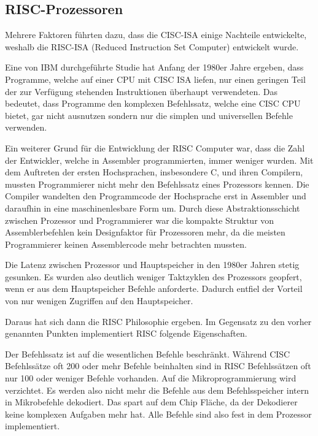 \documentclass[12pt]{article}
\begin{document}
\subsection{RISC-Prozessoren}
Mehrere Faktoren führten dazu, dass die CISC-ISA einige Nachteile entwickelte, weshalb die RISC-ISA (Reduced Instruction Set Computer) entwickelt wurde.


Eine von IBM durchgeführte Studie hat Anfang der 1980er Jahre ergeben, dass Programme, welche auf einer CPU mit CISC ISA liefen, nur einen geringen Teil der zur Verfügung stehenden Instruktionen überhaupt verwendeten. Das bedeutet, dass Programme den komplexen Befehlssatz, welche eine CISC CPU bietet, gar nicht ausnutzen sondern nur die simplen und universellen Befehle verwenden. 

Ein weiterer Grund für die Entwicklung der RISC Computer war, dass die Zahl der Entwickler, welche in Assembler programmierten, immer weniger wurden. Mit dem Auftreten der ersten Hochsprachen, insbesondere C, und ihren Compilern, mussten Programmierer nicht mehr den Befehlssatz eines Prozessors kennen. Die Compiler wandelten den Programmcode der Hochsprache erst in Assembler und daraufhin in eine maschinenlesbare Form um. Durch diese Abstraktionsschicht zwischen Prozessor und Programmierer war die kompakte Struktur von Assemblerbefehlen kein Designfaktor für Prozessoren mehr, da die meisten Programmierer keinen Assemblercode mehr betrachten mussten.

Die Latenz zwischen Prozessor und Hauptspeicher in den 1980er Jahren stetig gesunken. Es wurden also deutlich weniger Taktzyklen des Prozessors geopfert, wenn er aus dem Hauptspeicher Befehle anforderte. Dadurch entfiel der Vorteil von nur wenigen Zugriffen auf den Hauptspeicher.

\noindent
Daraus hat sich dann die RISC Philosophie ergeben. Im Gegensatz zu den vorher genannten Punkten implementiert RISC folgende Eigenschaften.

Der Befehlssatz ist auf die wesentlichen Befehle beschränkt. Während CISC Befehlssätze oft 200 oder mehr Befehle beinhalten sind in RISC Befehlssätzen oft nur 100 oder weniger Befehle vorhanden.
Auf die Mikroprogrammierung wird verzichtet. Es werden also nicht mehr die Befehle aus dem Befehlsspeicher intern in Mikrobefehle dekodiert. Das spart auf dem Chip Fläche, da der Dekodierer keine komplexen Aufgaben mehr hat. Alle Befehle sind also fest in dem Prozessor implementiert.
\end{document}
